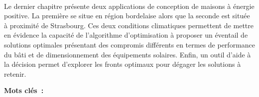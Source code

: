\paragraph{} %
Le dernier chapitre présente deux applications de conception de maisons à énergie
positive. La première se situe en région bordelaise alors que la seconde est située à
proximité de Strasbourg. Ces deux conditions climatiques permettent de mettre en évidence
la capacité de l’algorithme d’optimisation à proposer un éventail de solutions optimales
présentant des compromis différents en termes de performance du bâti et de dimensionnement
des équipements solaires. Enfin, un outil d’aide à la décision permet d’explorer les
fronts optimaux pour dégager les solutions à retenir.

\vfill
\noindent\textbf{Mots clés~: } \keywordsFR
